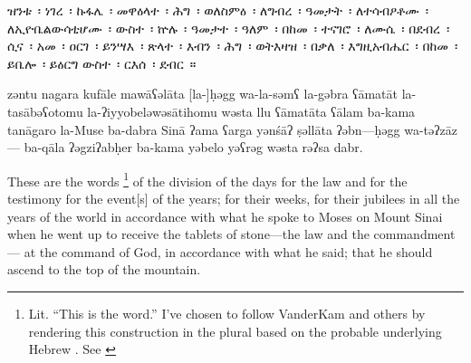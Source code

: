 
\begin{ethiopictext}
        ዝንቱ~፡ ነገረ~፡ ኩፋሌ~፡
        መዋዕላተ~፡ ሕግ~፡ ወለስምዕ~፡
        ለግብረ~፡ ዓመታት~፡ ለተሳብዖቶሙ~፡ 
        ለኢዮቤልውሳቲሆሙ~፡ ውስተ~፡ ኵሉ~፡ ዓመታተ~፡ ዓለም~፡
        በከመ~፡ ተናገሮ~፡ ለሙሴ~፡ በደብረ~፡ ሲና~፡
        አመ~፡ ዐርገ~፡ ይንሣእ~፡ ጽላተ~፡ እብን~፡ ሕግ~፡ ወትእዛዝ~፡ 
        በቃለ~፡ እግዚአብሔር~፡ በከመ~፡ ይቤሎ~፡ ይዕርግ ውስተ~፡ ርእሰ~፡ ደብር~።
\end{ethiopictext}

\begin{transliteration}
        zəntu nagara kufāle
        mawāʕəlāta [la-]ḥəgg wa-la-səmʕ
        la-gəbra ʕāmatāt la-tasābəʕotomu
        la-ʔiyyobeləwəsātihomu wəsta llu ʕāmatāta ʕālam
        ba-kama tanāgaro la-Muse ba-dabra Sinā
        ʔama ʕarga yənśāʔ ṣəllāta ʔəbn---ḥəgg wa-təʔzāz---%
        ba-qāla ʔəgziʔabḥer ba-kama yəbelo yəʕrəg wəsta rəʔsa dabr.
\end{transliteration}

\begin{translation}
        These are the words%
        \footnote{Lit. ``This is the word.'' I've chosen to follow VanderKam and others by rendering this construction in the plural based on the probable underlying Hebrew . See \cite[125]{vanderkam2018}}
        of the division 
        of the days for the law and for the testimony
        for the event[s] of the years; for their weeks,
        for their jubilees in all the years of the world
        in accordance with what he spoke to Moses on Mount Sinai 
        when he went up to receive the tablets of stone---the law and the commandment---%
        at the command of God, in accordance with what he said;
        that he should ascend to the top of the mountain.
\end{translation}
